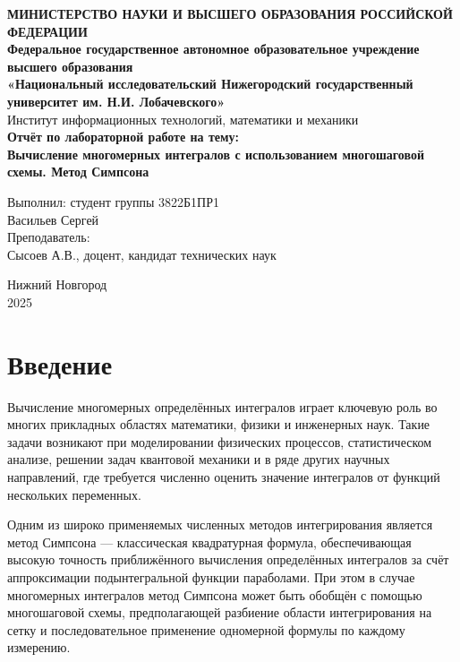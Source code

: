 \documentclass[a4paper,12pt]{article}
\begin{document}
\begin{titlepage}
\begin{center}
\textbf{МИНИСТЕРСТВО НАУКИ И ВЫСШЕГО ОБРАЗОВАНИЯ РОССИЙСКОЙ ФЕДЕРАЦИИ} \\[0.5cm]
\textbf{Федеральное государственное автономное образовательное учреждение высшего образования} \\[0.5cm]
\textbf{«Национальный исследовательский Нижегородский государственный университет им. Н.И. Лобачевского»} \\[0.5cm]
Институт информационных технологий, математики и механики \\
\vfill
{\Large
\textbf{Отчёт по лабораторной работе на тему:} \\[0.5cm]
\textbf{ Вычисление многомерных интегралов с использованием многошаговой схемы. Метод Симпсона} \\
}
\vfill
\begin{flushright}
Выполнил: студент группы 3822Б1ПР1 \\
Васильев Сергей \\
\vspace{1cm}
Преподаватель: \\
Сысоев А.В., доцент, кандидат технических наук \\
\end{flushright}
\vfill
Нижний Новгород \\
2025
\end{center}
\end{titlepage}

\tableofcontents
\newpage

\section{Введение}

Вычисление многомерных определённых интегралов играет ключевую роль во многих прикладных областях математики, физики и инженерных наук. Такие задачи возникают при моделировании физических процессов, статистическом анализе, решении задач квантовой механики и в ряде других научных направлений, где требуется численно оценить значение интегралов от функций нескольких переменных.

Одним из широко применяемых численных методов интегрирования является метод Симпсона — классическая квадратурная формула, обеспечивающая высокую точность приближённого вычисления определённых интегралов за счёт аппроксимации подынтегральной функции параболами. При этом в случае многомерных интегралов метод Симпсона может быть обобщён с помощью многошаговой схемы, предполагающей разбиение области интегрирования на сетку и последовательное применение одномерной формулы по каждому измерению.
\end{document}
